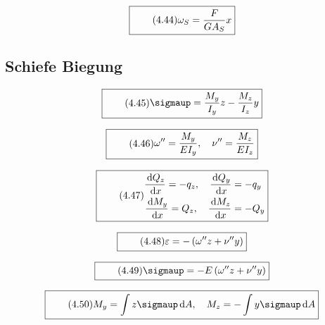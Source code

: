 \documentclass[11pt]{article}
\newcommand{\1}{ {\mathds{1}} }
\newcommand{\td}{\,\text{d}}
\renewcommand{\epsilon}{\varepsilon}
\renewcommand{\sigma  }{\sigmaup   }
\begin{document}
		\begin{equation}
			\boxed{
				\tag{4.44}
				\begin{split}
					\omega_S= \frac{F}{GA_S}x
				\end{split}
			}
		\end{equation}

		\subsection{Schiefe Biegung}

		\begin{equation}
			\boxed{
				\tag{4.45}
				\begin{split}
					\sigma = \frac{M_y}{I_y}z - \frac{M_z}{I_z}y
				\end{split}
			}
		\end{equation}
		
		\begin{equation}
			\boxed{
				\tag{4.46}
				\begin{split}
					\omega'' = \frac{M_y}{EI_y} , \quad \nu '' = \frac{M_z}{EI_z}
				\end{split}
			}
		\end{equation}

		\begin{equation}
			\boxed{
				\tag{4.47}
				\begin{split}
					\frac{\td Q_z}{\td x} = -q_z, \quad \frac{\td Q_y}{\td x} &= -q_y\\
					\frac{\td M_y}{\td x} = Q_z, \quad \frac{\td M_z}{\td x} &= -Q_y
				\end{split}
			}
		\end{equation}

		\begin{equation}
			\boxed{
				\tag{4.48}
				\begin{split}
					\epsilon = -\left(\omega'' z + \nu'' y\right)
				\end{split}
			}
		\end{equation}
		
		\begin{equation}
			\boxed{
				\tag{4.49}
				\begin{split}
					\sigma = -E\left(\omega'' z + \nu'' y\right)
				\end{split}
			}
		\end{equation}
		
		\begin{equation}
			\boxed{
				\tag{4.50}
				\begin{split}
					M_y = \int z\sigma\td A , \quad M_z = - \int y \sigma \td A
				\end{split}
			}
		\end{equation}
		
\end{document}
